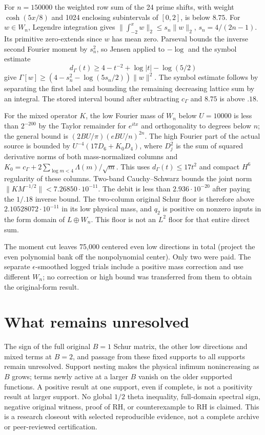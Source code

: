 \documentclass[11pt,a4paper]{article}
\numberwithin{equation}{section}
\theoremstyle{definition}\newtheorem{definition}[theorem]{Definition}
\theoremstyle{remark}\newtheorem{remark}[theorem]{Remark}
\begin{document}
For $n=150000$ the weighted row sum of the 24 prime shifts, with weight $\cosh(5x/8)$ and 1024 enclosing subintervals of $[0,2]$, is below $8.75$. For $w\in W_n$, Legendre integration gives $\|\int_{-2}^{x}w\|_2\le s_n\|w\|_2$, $s_n=4/(2n-1)$. Its primitive zero-extends since $w$ has mean zero. Parseval bounds the inverse second Fourier moment by $s_n^2$, so Jensen applied to $-\log$ and the symbol estimate
\[
 d_\Gamma(t)\ge4-t^{-2}+\log|t|-\log(5/2)
\]
give $\Gamma[w]\ge(4-s_n^2-\log(5s_n/2))\|w\|^2$. The symbol estimate follows by separating the first label and bounding the remaining decreasing lattice sum by an integral. The stored interval bound after subtracting $c_\Gamma$ and $8.75$ is above $.18$.

For the mixed operator $K$, the low Fourier mass of $W_n$ below $U=10000$ is less than $2^{-200}$ by the Taylor remainder for $e^{itx}$ and orthogonality to degrees below $n$; the general bound is $(2BU/\pi)(eBU/n)^{2n}$. The high Fourier part of the actual source is bounded by $U^{-4}(17D_6+K_0 D_4)$, where $D_j^2$ is the sum of squared derivative norms of both mass-normalized columns and $K_0=c_\Gamma+2\sum_{\log m<4}\Lambda(m)/\sqrt m$. This uses $d_\Gamma(t)\le17t^2$ and compact $H^6$ regularity of these columns. Two-band Cauchy--Schwarz bounds the joint norm $\|KM^{-1/2}\|<7.26850\cdot10^{-11}$. The debit is less than $2.936\cdot10^{-20}$ after paying the $1/.18$ inverse bound. The two-column original Schur floor is therefore above $2.10528072\cdot10^{-11}$ in its low physical mass, and $q_2$ is positive on nonzero inputs in the form domain of $L\oplus W_n$. This floor is not an $L^2$ floor for that entire direct sum.

The moment cut leaves 75,000 centered even low directions in total (project the even polynomial bank off the nonpolynomial center). Only two were paid. The separate $\epsilon$-smoothed logged trials include a positive mass correction and use different $W_n$; no correction or high bound was transferred from them to obtain the original-form result.

\section{What remains unresolved}
The sign of the full original $B=1$ Schur matrix, the other low directions and mixed terms at $B=2$, and passage from these fixed supports to all supports remain unresolved. Support nesting makes the physical infimum nonincreasing as $B$ grows; terms newly active at a larger $B$ vanish on the older supported functions. A positive result at one support, even if complete, is not a positivity result at larger support. No global $1/2$ theta inequality, full-domain spectral sign, negative original witness, proof of RH, or counterexample to RH is claimed. This is a research closeout with selected reproducible evidence, not a complete archive or peer-reviewed certification.
\end{document}
